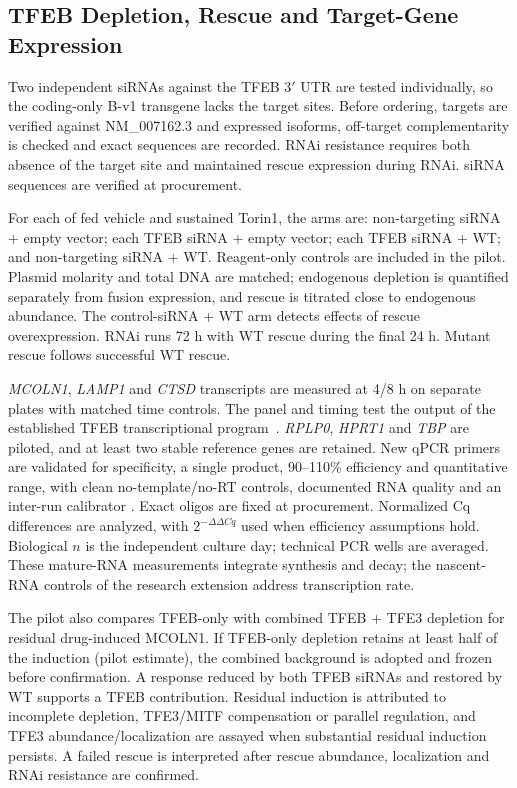\subsection{TFEB Depletion, Rescue and Target-Gene Expression}
Two independent siRNAs against the TFEB 3$'$ UTR are tested individually, so the coding-only B-v1 transgene lacks the target sites. Before ordering, targets are verified against NM\_007162.3 and expressed isoforms, off-target complementarity is checked and exact sequences are recorded. RNAi resistance requires both absence of the target site and maintained rescue expression during RNAi. siRNA sequences are verified at procurement.

For each of fed vehicle and sustained Torin1, the arms are: non-targeting siRNA + empty vector; each TFEB siRNA + empty vector; each TFEB siRNA + WT; and non-targeting siRNA + WT. Reagent-only controls are included in the pilot. Plasmid molarity and total DNA are matched; endogenous depletion is quantified separately from fusion expression, and rescue is titrated close to endogenous abundance. The control-siRNA + WT arm detects effects of rescue overexpression. RNAi runs 72 h with WT rescue during the final 24 h. Mutant rescue follows successful WT rescue.

\textit{MCOLN1}, \textit{LAMP1} and \textit{CTSD} transcripts are measured at 4/8 h on separate plates with matched time controls. The panel and timing test the output of the established TFEB transcriptional program~\cite{Settembre2011}. \textit{RPLP0}, \textit{HPRT1} and \textit{TBP} are piloted, and at least two stable reference genes are retained. New qPCR primers are validated for specificity, a single product, 90--110\% efficiency and quantitative range, with clean no-template/no-RT controls, documented RNA quality and an inter-run calibrator \cite{Bustin2009}. Exact oligos are fixed at procurement. Normalized Cq differences are analyzed, with $2^{-\Delta\Delta Cq}$ used when efficiency assumptions hold. Biological $n$ is the independent culture day; technical PCR wells are averaged. These mature-RNA measurements integrate synthesis and decay; the nascent-RNA controls of the research extension address transcription rate.

The pilot also compares TFEB-only with combined TFEB + TFE3 depletion for residual drug-induced MCOLN1. If TFEB-only depletion retains at least half of the induction (pilot estimate), the combined background is adopted and frozen before confirmation. A response reduced by both TFEB siRNAs and restored by WT supports a TFEB contribution. Residual induction is attributed to incomplete depletion, TFE3/MITF compensation or parallel regulation, and TFE3 abundance/localization are assayed when substantial residual induction persists. A failed rescue is interpreted after rescue abundance, localization and RNAi resistance are confirmed.

